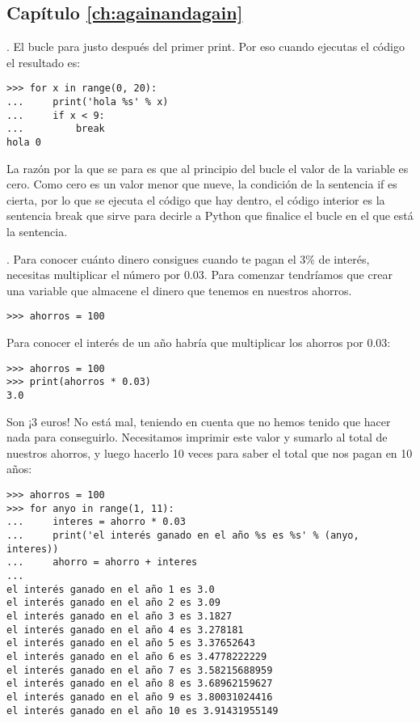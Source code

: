\subsection*{Capítulo \ref{ch:againandagain}}

. El bucle para justo después del primer print.   Por eso cuando ejecutas el código el resultado es:

\begin{listing}
\begin{verbatim}
>>> for x in range(0, 20):
...     print('hola %s' % x)
...     if x < 9:
...         break
hola 0
\end{verbatim}
\end{listing}

\noindent
La razón por la que se para es que al principio del bucle el valor de la variable  es cero.   Como cero es un valor menor que nueve, la condición de la sentencia if es cierta, por lo que se ejecuta el código que hay dentro, el código interior es la sentencia break que sirve para decirle a Python que finalice el bucle en el que está la sentencia.

. Para conocer cuánto dinero consigues cuando te pagan el 3\% de interés, necesitas multiplicar el número por 0.03.   Para comenzar tendríamos que crear una variable que almacene el dinero que tenemos en nuestros ahorros.

\begin{listing}
\begin{verbatim}
>>> ahorros = 100
\end{verbatim}
\end{listing}

Para conocer el interés de un año habría que multiplicar los ahorros por 0.03:

\begin{listing}
\begin{verbatim}
>>> ahorros = 100
>>> print(ahorros * 0.03)
3.0
\end{verbatim}
\end{listing}

Son ¡3 euros!    No está mal, teniendo en cuenta que no hemos tenido que hacer nada para conseguirlo.   Necesitamos imprimir este valor y sumarlo al total de nuestros ahorros, y luego hacerlo 10 veces para saber el total que nos pagan en 10 años:

\begin{listing}
\begin{verbatim}
>>> ahorros = 100
>>> for anyo in range(1, 11):
...     interes = ahorro * 0.03
...     print('el interés ganado en el año %s es %s' % (anyo, interes))
...     ahorro = ahorro + interes
... 
el interés ganado en el año 1 es 3.0
el interés ganado en el año 2 es 3.09
el interés ganado en el año 3 es 3.1827
el interés ganado en el año 4 es 3.278181
el interés ganado en el año 5 es 3.37652643
el interés ganado en el año 6 es 3.4778222229
el interés ganado en el año 7 es 3.58215688959
el interés ganado en el año 8 es 3.68962159627
el interés ganado en el año 9 es 3.80031024416
el interés ganado en el año 10 es 3.91431955149
\end{verbatim}
\end{listing}

